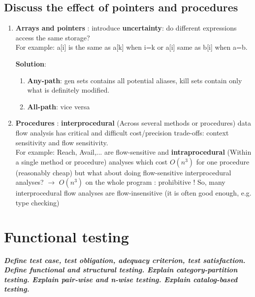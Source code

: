 \documentclass{article}
\begin{document}
\newpage
\subsection{Discuss the effect of pointers and procedures}
\begin{enumerate}
    \item \textbf{Arrays and pointers} : introduce \textbf{uncertainty}: do different expressions access the same storage? \\For example: a[i] is the same as a[k] when i=k or a[i] same as b[i] when a=b. 
    
    \textbf{Solution}: 
    \begin{enumerate}
        \item \textbf{Any-path}: gen sets contains all potential aliases, kill sets contain only what is definitely modified.
        \item \textbf{All-path}: vice versa\\
    \end{enumerate}
    \item \textbf{Procedures} : \textbf{interprocedural} (Across several methods or procedures) data flow analysis has critical and difficult cost/precision trade-offs: context sensitivity and flow sensitivity. \\For example: Reach, Avail,... are flow-sensitive and \textbf{intraprocedural} (Within
a
single
method
or
procedure) analyses which cost $O(n^3)$ for one procedure (reasonably cheap) but what about doing flow-sensitive interprocedural analyses? $\rightarrow$ $O(n^3)$ on the whole program : prohibitive ! So, many interprocedural flow analyses are flow-insensitive (it is often good enough, e.g. type checking)
\end{enumerate}


\newpage
\section{Functional testing}
\textbf{\textit{Define test case, test obligation, adequacy criterion, test satisfaction. Define functional and structural testing. Explain category-partition testing. Explain pair-wise and n-wise testing. Explain catalog-based testing.}}
\end{document}
